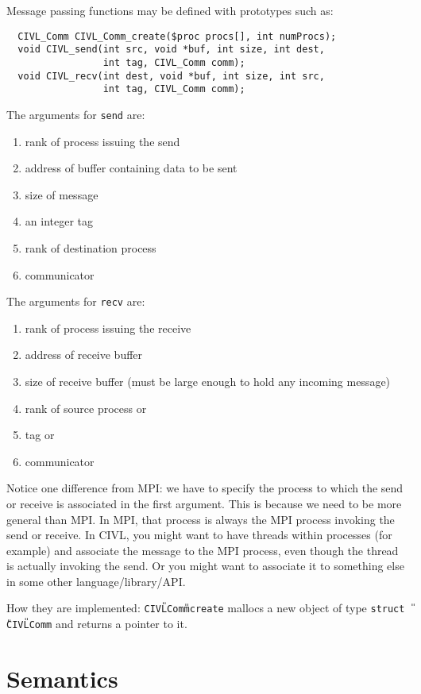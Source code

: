 \documentclass[11pt]{book}
\begin{document}
Message passing functions may be defined with prototypes such as:
\begin{verbatim}
  CIVL_Comm CIVL_Comm_create($proc procs[], int numProcs);
  void CIVL_send(int src, void *buf, int size, int dest,
                 int tag, CIVL_Comm comm);
  void CIVL_recv(int dest, void *buf, int size, int src,
                 int tag, CIVL_Comm comm);
\end{verbatim}

The arguments for \texttt{send} are:
\begin{enumerate}
\item rank of process issuing the send
\item address of buffer containing data to be sent
\item size of message
\item an integer tag
\item rank of destination process
\item communicator
\end{enumerate}

The arguments for \texttt{recv} are:
\begin{enumerate}
\item rank of process issuing the receive
\item address of receive buffer
\item size of receive buffer (must be large enough to hold any incoming message)
\item rank of source process or 
\item tag or 
\item communicator
\end{enumerate}

Notice one difference from MPI: we have to specify the process to
which the send or receive is associated in the first argument. This is
because we need to be more general than MPI. In MPI, that process is
always the MPI process invoking the send or receive. In CIVL, you
might want to have threads within processes (for example) and
associate the message to the MPI process, even though the thread is
actually invoking the send. Or you might want to associate it to
something else in some other language/library/API.

How they are implemented: \texttt{CIVL{\U}Comm{\U}create}
mallocs a new object of type \texttt{struct {\U}CIVL{\U}Comm} and returns
a pointer to it.


\part{Semantics}
\end{document}
